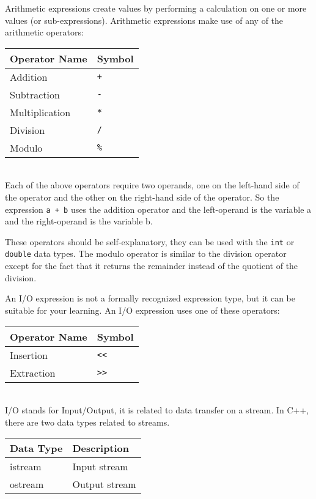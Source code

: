 \documentclass[a4paper,12pt]{article}
\begin{document}
Arithmetic expressions create values by performing a calculation on one or more values (or sub-expressions). Arithmetic expressions make use of any of the arithmetic operators: \\

\begin{tabular}{|l|l|}
\hline
Operator Name & Symbol \\
\hline
Addition & \texttt{+} \\
\hline
Subtraction & \texttt{-} \\
\hline
Multiplication & \texttt{*} \\
\hline
Division & \texttt{/} \\
\hline
Modulo & \texttt{\%} \\
\hline
\end{tabular} \\

Each of the above operators require two operands, one on the left-hand side of the operator and the other on the right-hand side of the operator. So the expression \texttt{a + b} uses the addition operator and the left-operand is the variable a and the right-operand is the variable b.

These operators should be self-explanatory, they can be used with the \texttt{int} or \texttt{double} data types. The modulo operator is similar to the division operator except for the fact that it returns the remainder instead of the quotient of the division. 

An I/O expression is not a formally recognized expression type, but it can be suitable for your learning. An I/O expression uses one of these operators: \\

\begin{tabular}{|l|l|}
\hline
Operator Name & Symbol \\
\hline
Insertion & \texttt{<<} \\
\hline
Extraction & \texttt{>>} \\
\hline
\end{tabular} \\

I/O stands for Input/Output, it is related to data transfer on a stream. In C++, there are two data types related to streams. \\

\begin{tabular}{|l|l|}
\hline
Data Type & Description \\
\hline
istream & Input stream \\
\hline
ostream & Output stream \\
\hline
\end{tabular} \\
\end{document}
